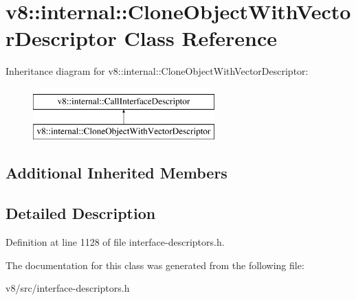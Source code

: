 \hypertarget{classv8_1_1internal_1_1CloneObjectWithVectorDescriptor}{}\section{v8\+:\+:internal\+:\+:Clone\+Object\+With\+Vector\+Descriptor Class Reference}
\label{classv8_1_1internal_1_1CloneObjectWithVectorDescriptor}
Inheritance diagram for v8\+:\+:internal\+:\+:Clone\+Object\+With\+Vector\+Descriptor\+:\begin{figure}[H]
\begin{center}
\leavevmode
\includegraphics[height=2.000000cm]{classv8_1_1internal_1_1CloneObjectWithVectorDescriptor}
\end{center}
\end{figure}
\subsection*{Additional Inherited Members}


\subsection{Detailed Description}


Definition at line 1128 of file interface-\/descriptors.\+h.



The documentation for this class was generated from the following file\+:\begin{DoxyCompactItemize}
\item 
v8/src/interface-\/descriptors.\+h\end{DoxyCompactItemize}
